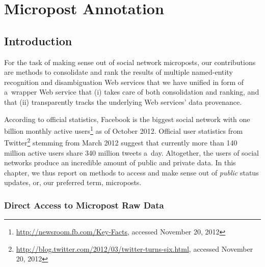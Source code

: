 \chapter{Micropost Annotation}
\label{cha:micropost-annotation}

\ifpdf
    \graphicspath{{4_micropost_annotation/figures/PNG/}{4_micropost_annotation/figures/PDF/}{4_micropost_annotation/figures/}}
\else
    \graphicspath{{4_micropost_annotation/figures/EPS/}{4_micropost_annotation/figures/}}
\fi

\section{Introduction}

For the task of making sense out of social network microposts,
our contributions are methods to consolidate and rank
the results of multiple named-entity recognition and
disambiguation Web services that we have unified in form
of a~wrapper Web service that (i) takes care of both
consolidation and ranking, and that
(ii) transparently tracks the underlying Web services'
data provenance.

According to official statistics, Facebook is the biggest
social network with one billion monthly active
users\footnote{\url{http://newsroom.fb.com/Key-Facts},
accessed November 20, 2012}
as of October 2012.
Official user statistics from
Twitter\footnote{\url{http://blog.twitter.com/2012/03/twitter-turns-six.html},
accessed November 20, 2012}
stemming from March 2012 suggest
that currently more than 140 million active users
share 340 million tweets a~day.
Altogether, the users of social networks
produce an incredible amount of public and private data.
In this chapter, we thus report on methods to access and make sense
out of \emph{public} status updates,
or, our preferred term, microposts.

\subsection{Direct Access to Micropost Raw Data}


